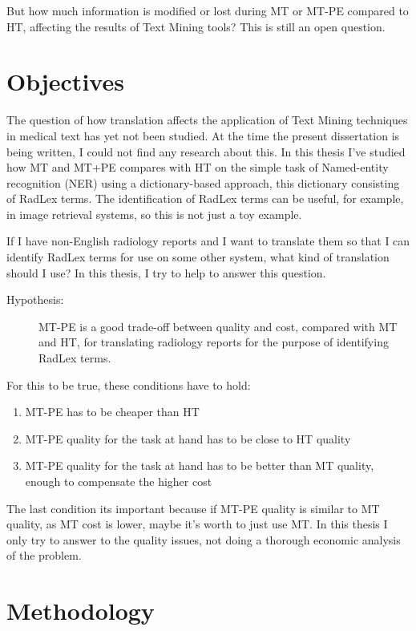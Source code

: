 But how much information is modified or lost during MT or MT-PE compared to HT, affecting the results of Text Mining tools? This is still an open question. 

\section{Objectives}

The question of how translation affects the application of Text Mining techniques in medical text has yet not been studied. At the time the present dissertation is being written, I could not find any research about this. In this thesis I've studied how MT and MT+PE compares with HT on the simple task of Named-entity recognition (NER) using a dictionary-based approach, this dictionary consisting of RadLex terms. The identification of RadLex terms can be useful, for example, in image retrieval \citep{Gerstmair2012} systems, so this is not just a toy example. 

If I have non-English radiology reports and I want to translate them so that I can identify RadLex terms for use on some other system, what kind of translation should I use? In this thesis, I try to help to answer this question. 

\newcommand{\hypothesis}{
\begin{description}
	\item[Hypothesis:] MT-PE is a good trade-off between quality and cost, compared with MT and HT, for translating radiology reports for the purpose of identifying RadLex terms. 
\end{description}
}
\hypothesis

For this to be true, these conditions have to hold:

\begin{enumerate}
	\item MT-PE has to be cheaper than HT
	\item MT-PE quality for the task at hand has to be close to HT quality
	\item MT-PE quality for the task at hand has to be better than MT quality, enough to compensate the higher cost
\end{enumerate}

The last condition its important because if MT-PE quality is similar to MT quality, as MT cost is lower, maybe it's worth to just use MT. In this thesis I only try to answer to the quality issues, not doing a thorough economic analysis of the problem. 

\section{Methodology}

